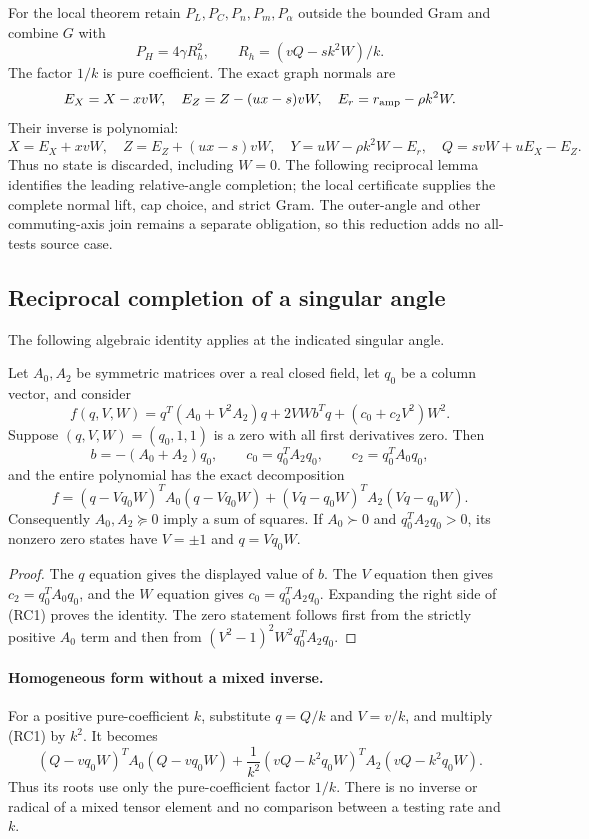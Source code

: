 For the local theorem retain $P_L,P_C,P_n,P_m,P_\alpha$ outside the
bounded Gram and combine $G$ with
\[
 P_H=4\gamma R_h^2,\qquad R_h=(vQ-sk^2W)/k.
 \tag{UR17}
\]
The factor $1/k$ is pure coefficient. The exact graph normals are
\[
 E_X=X-xvW,\quad E_Z=Z-(ux-s)vW,\quad
 E_r=r_{\rm amp}-\rho k^2W.
\]
Their inverse is polynomial:
\[
 X=E_X+xvW,\quad Z=E_Z+(ux-s)vW,\quad
 Y=uW-\rho k^2W-E_r,\quad Q=svW+uE_X-E_Z.
\]
Thus no state is discarded, including $W=0$. The following reciprocal
lemma identifies the leading relative-angle completion; the local
certificate supplies the complete normal lift, cap choice, and strict
Gram. The outer-angle and other commuting-axis join remains a separate
obligation, so this reduction adds no all-tests source case.

\subsection{Reciprocal completion of a singular angle}
\label{component:pa142a027a282}

\label{pa142a027a282:sec:ui-reciprocal-contact}

The following algebraic identity applies at the indicated singular angle.

\begin{lemma}
Let $A_0,A_2$ be symmetric matrices over a real closed field, let
$q_0$ be a column vector, and consider
\[
 f(q,V,W)=q^T(A_0+V^2A_2)q+2VW b^Tq+(c_0+c_2V^2)W^2.
\]
Suppose $(q,V,W)=(q_0,1,1)$ is a zero with all first derivatives
zero. Then
\[
 b=-(A_0+A_2)q_0,\qquad
 c_0=q_0^TA_2q_0,\qquad c_2=q_0^TA_0q_0,
\]
and the entire polynomial has the exact decomposition
\[
 \boxed{f=(q-Vq_0W)^TA_0(q-Vq_0W)
             +(Vq-q_0W)^TA_2(Vq-q_0W).}             \tag{RC1}
\]
Consequently $A_0,A_2\succeq0$ imply a sum of squares. If
$A_0\succ0$ and $q_0^TA_2q_0>0$, its nonzero zero states have
$V=\pm1$ and $q=Vq_0W$.
\end{lemma}
\begin{proof}
The $q$ equation gives the displayed value of $b$. The $V$
equation then gives $c_2=q_0^TA_0q_0$, and the $W$ equation gives
$c_0=q_0^TA_2q_0$. Expanding the right side of (RC1) proves the
identity. The zero statement follows first from the strictly positive
$A_0$ term and then from $(V^2-1)^2W^2q_0^TA_2q_0$.
\end{proof}

\paragraph{Homogeneous form without a mixed inverse.}
For a positive pure-coefficient $k$, substitute $q=Q/k$ and
$V=v/k$, and multiply (RC1) by $k^2$. It becomes
\[
 (Q-vq_0W)^TA_0(Q-vq_0W)
 +\frac1{k^2}(vQ-k^2q_0W)^TA_2(vQ-k^2q_0W).       \tag{RC2}
\]
Thus its roots use only the pure-coefficient factor $1/k$.
There is no inverse or radical of a mixed tensor element and no
comparison between a testing rate and $k$.

